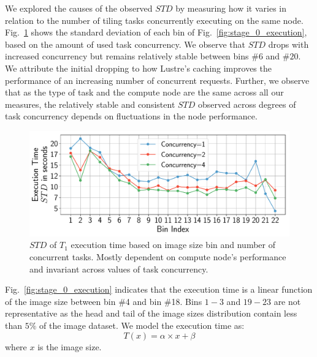 We explored the causes of the observed $STD$ by measuring how it varies in 
relation to the number of tiling tasks concurrently executing on the same node.
Fig.~\ref{fig:concurrency_test} shows the standard deviation of each bin of 
Fig.~\ref{fig:stage_0_execution}, based on the amount of used task concurrency.
We observe that $STD$ drops with increased concurrency but remains relatively 
stable between bins $\#6$ and $\#20$. We attribute the initial dropping to how 
Lustre's caching improves the performance of an increasing number of 
concurrent requests. Further, we observe that as the type of task and the 
compute node are the same across all our measures, the relatively stable and 
consistent $STD$ observed across degrees of task concurrency depends on 
fluctuations in the node performance.

\begin{figure}[t]
    \centering
    \includegraphics[width=.75\textwidth]{figures/designs/concerrency_std.pdf}
    \caption{$STD$ of $T_{1}$ execution time based on image size bin and 
    number of concurrent tasks. Mostly dependent on compute node's performance 
    and invariant across values of task concurrency.}
    \label{fig:concurrency_test}
\end{figure}

Fig.~\ref{fig:stage_0_execution} indicates that the execution time is a linear 
function of the image size between bin \#4 and bin \#18. Bins $1-3$ and 
$19-23$ are not representative as the head and tail of the image sizes 
distribution contain less than $5\%$ of the image dataset. We model the 
execution time as:
\begin{equation}
T(x) = \alpha \times x+\beta
\label{eq:des1_til}
\end{equation} where $x$ is the image size.


